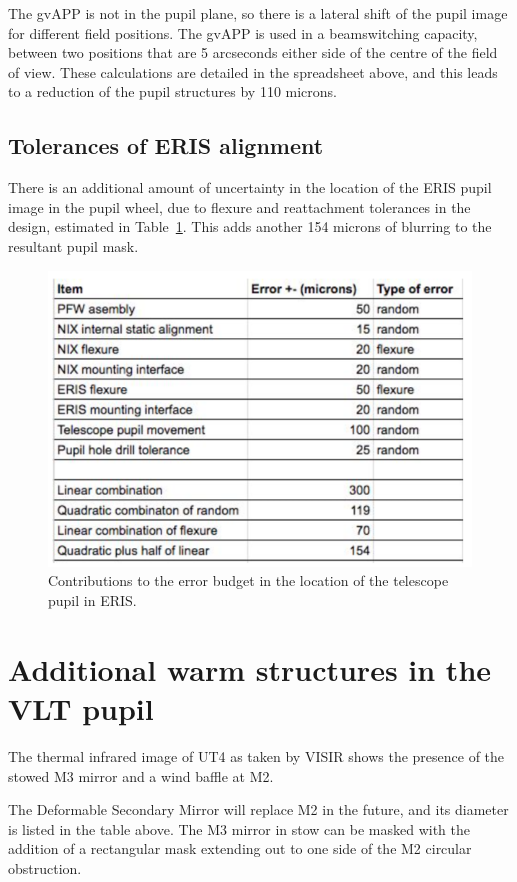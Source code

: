 \documentclass[a4paper,11pt]{article}
\begin{document}
The gvAPP is not in the pupil plane, so there is a lateral shift of the pupil image for different field positions. The gvAPP is used in a beamswitching capacity, between two positions that are 5 arcseconds either side of the centre of the field of view. These calculations are detailed in the spreadsheet above, and this leads to a reduction of the pupil structures by 110 microns.

\subsection{Tolerances of ERIS alignment}

There is an additional amount of uncertainty in the location of the ERIS
pupil image in the pupil wheel, due to flexure and reattachment
tolerances in the design, estimated in Table~\ref{tab:errors}. This adds another 154 microns of blurring to the resultant pupil mask.

\begin{figure}[htp]
\centering
\includegraphics[angle=0,width=0.7\columnwidth]{error_budget}
\caption{ \label{tab:errors} Contributions to the error budget in the
location of the telescope pupil in ERIS.}
\end{figure}

\section{Additional warm structures in the VLT pupil}

The thermal infrared image of UT4 as taken by VISIR shows the presence of the stowed M3 mirror and a wind baffle at M2.

The Deformable Secondary Mirror will replace M2 in the future, and its diameter is listed in the table above. The M3 mirror in stow can be masked with the addition of a rectangular mask extending out to one side of the M2 circular obstruction.
\end{document}
